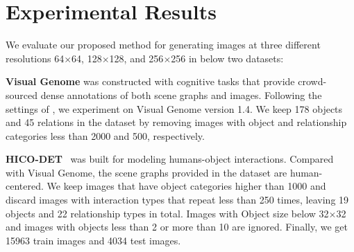 \section{Experimental Results}


We evaluate our proposed method for generating images at three different resolutions 64$\times$64, 128$\times$128, and 256$\times$256 in below two datasets:

\noindent\textbf{Visual Genome} \cite{krishna2017visual} was constructed with cognitive tasks that provide crowd-sourced dense annotations of both scene graphs and images. Following the settings of \cite{johnson2018image}, we experiment on Visual Genome version 1.4. %
We keep 178 objects and 45 relations in the dataset by removing images with object and relationship categories less than 2000 and 500, respectively. 

\noindent\textbf{HICO-DET}~\cite{chao2018learning} was built for modeling humans-object interactions. Compared with Visual Genome, the scene graphs provided in the dataset are human-centered. %
We keep images that have object categories higher than 1000 and discard images with interaction types that repeat less than 250 times, leaving 19 objects and 22 relationship types in total. Images with Object size below 32$\times$32 and images with objects less than 2 or more than 10 are ignored. Finally, we get 15963 train images and 4034 test images.

